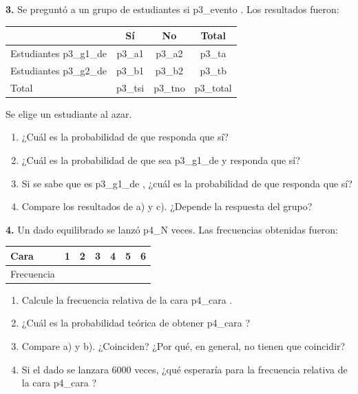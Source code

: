 \documentclass[10pt]{article}
\begin{document}
{{\vspace{0.3cm}

\textbf{3. } Se preguntó a un grupo de estudiantes si {{ p3_evento }}. Los resultados fueron:

\begin{center}
\begin{tabular}{lccc}
\hline
 & Sí & No & Total \\ \hline
Estudiantes {{ p3_g1_de }} & {{ p3_a1 }} & {{ p3_a2 }} & {{ p3_ta }} \\
Estudiantes {{ p3_g2_de }} & {{ p3_b1 }} & {{ p3_b2 }} & {{ p3_tb }} \\ \hline
Total & {{ p3_tsi }} & {{ p3_tno }} & {{ p3_total }} \\ \hline
\end{tabular}
\end{center}

Se elige un estudiante al azar.
\begin{enumerate}
\item[\small a)] ¿Cuál es la probabilidad de que responda que sí?
\item[\small b)] ¿Cuál es la probabilidad de que sea {{ p3_g1_de }} y responda que sí?
\item[\small c)] Si se sabe que es {{ p3_g1_de }}, ¿cuál es la probabilidad de que responda que sí?
\item[\small d)] Compare los resultados de a) y c). ¿Depende la respuesta del grupo?
\end{enumerate}

\vspace{0.3cm}

\textbf{4. } Un dado equilibrado se lanzó {{ p4_N }} veces. Las frecuencias obtenidas fueron:

\begin{center}
\begin{tabular}{lcccccc}
\hline
Cara & 1 & 2 & 3 & 4 & 5 & 6 \\ \hline
Frecuencia {%
\end{tabular}
\end{center}

\begin{enumerate}
\item[\small a)] Calcule la frecuencia relativa de la cara {{ p4_cara }}.
\item[\small b)] ¿Cuál es la probabilidad teórica de obtener {{ p4_cara }}?
\item[\small c)] Compare a) y b). ¿Coinciden? ¿Por qué, en general, no tienen que coincidir?
\item[\small d)] Si el dado se lanzara 6000 veces, ¿qué esperaría para la frecuencia relativa de la cara {{ p4_cara }}?
\end{enumerate}

}}
\end{document}
